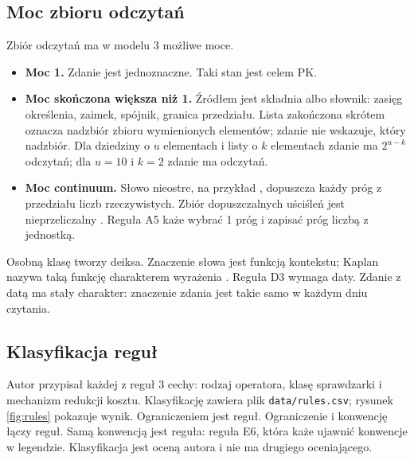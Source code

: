 

\subsection{Moc zbioru odczytań}

Zbiór odczytań ma w modelu 3 możliwe moce.
\begin{itemize}[leftmargin=1.6em]
  \item \textbf{Moc 1.} Zdanie jest jednoznaczne. Taki stan jest celem PK.
  \item \textbf{Moc skończona większa niż 1.} Źródłem jest składnia albo słownik: zasięg
  określenia, zaimek, spójnik, granica przedziału. Lista zakończona skrótem 
  oznacza nadzbiór zbioru wymienionych elementów; zdanie nie wskazuje, który nadzbiór. Dla dziedziny o $u$ elementach i listy
  o $k$ elementach zdanie ma $2^{u-k}$ odczytań; dla $u=10$ i $k=2$ zdanie ma \pkOpenList{} odczytań.
  \item \textbf{Moc continuum.} Słowo nieostre, na przykład , dopuszcza
  każdy próg z przedziału liczb rzeczywistych. Zbiór dopuszczalnych uściśleń jest
  nieprzeliczalny \cite{fine1975}. Reguła A5 każe wybrać 1 próg i zapisać próg liczbą
  z jednostką.
\end{itemize}

Osobną klasę tworzy deiksa. Znaczenie słowa  jest funkcją kontekstu; Kaplan
nazywa taką funkcję charakterem wyrażenia \cite{kaplan1989}. Reguła D3 wymaga daty.
Zdanie z datą ma stały charakter: znaczenie zdania jest takie samo w każdym dniu czytania.

\subsection{Klasyfikacja reguł}
\label{sec:rules}

Autor przypisał każdej z \pkRules{} reguł 3 cechy: rodzaj operatora, klasę sprawdzarki
i mechanizm redukcji kosztu. Klasyfikację zawiera plik \texttt{data/rules.csv};
rysunek \ref{fig:rules} pokazuje wynik. Ograniczeniem jest \pkRulesR{} reguł.
Ograniczenie i konwencję łączy \pkRulesRK{} reguł. Samą konwencją jest \pkRulesK{} reguła:
reguła E6, która każe ujawnić konwencje w legendzie. Klasyfikacja jest oceną autora
i nie ma drugiego oceniającego.

